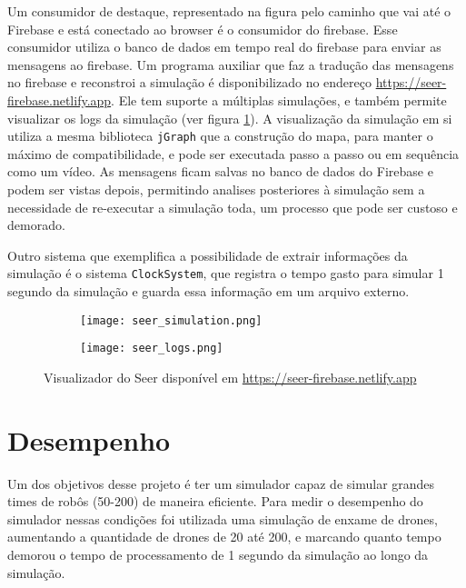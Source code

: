 Um consumidor de destaque, representado na figura pelo caminho que vai até o Firebase e está conectado ao browser é o consumidor do firebase. Esse consumidor utiliza o banco de dados em tempo real do firebase para enviar as mensagens ao firebase. Um programa auxiliar que faz a tradução das mensagens no firebase e reconstroi a simulação é disponibilizado no endereço \url{https://seer-firebase.netlify.app}. Ele tem suporte a múltiplas simulações, e também permite visualizar os logs da simulação (ver figura \ref{fig:dullens_big_contribution}). A visualização da simulação em si utiliza a mesma biblioteca \texttt{jGraph} que a construção do mapa, para manter o máximo de compatibilidade, e pode ser executada passo a passo ou em sequência como um vídeo. As mensagens ficam salvas no banco de dados do Firebase e podem ser vistas depois, permitindo analises posteriores à simulação sem a necessidade de re-executar a simulação toda, um processo que pode ser custoso e demorado. 

Outro sistema que exemplifica a possibilidade de extrair informações da simulação é o sistema \texttt{ClockSystem}, que registra o tempo gasto para simular 1 segundo da simulação e guarda essa informação em um arquivo externo.

\begin{figure}
    \centering
    \begin{subfigure}[b]{0.4\textwidth}
        \texttt{[image: seer\_simulation.png]}
    \end{subfigure}
    \hfill
    \begin{subfigure}[b]{0.5\textwidth}
        \texttt{[image: seer\_logs.png]}
    \end{subfigure}
    \caption{Visualizador do Seer disponível em \url{https://seer-firebase.netlify.app}}
    \label{fig:dullens_big_contribution}
\end{figure}

\section{Desempenho}
\label{sec:performance}

Um dos objetivos desse projeto é ter um simulador capaz de simular grandes times de robôs (50-200) de maneira eficiente. Para medir o desempenho do simulador nessas condições foi utilizada uma simulação de enxame de drones, aumentando a quantidade de drones de 20 até 200, e marcando quanto tempo demorou o tempo de processamento de 1 segundo da simulação ao longo da simulação. 


